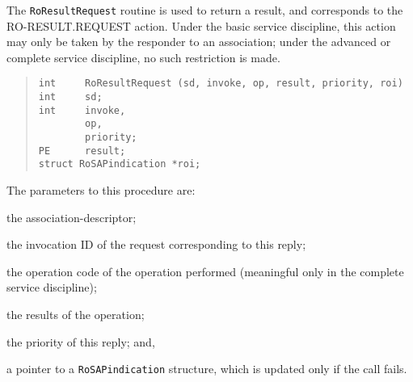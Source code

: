 The \verb"RoResultRequest" routine is used to return a result,
and corresponds to the {\sf RO-RESULT.REQUEST\/} action.
Under the basic service discipline,
this action may only be taken by the responder to an association;
under the advanced or complete service discipline,
no such restriction is made.
\begin{quote}\small\begin{verbatim}
int     RoResultRequest (sd, invoke, op, result, priority, roi)
int     sd;
int     invoke,
        op,
        priority;
PE      result;
struct RoSAPindication *roi;
\end{verbatim}\end{quote}
The parameters to this procedure are:
\begin{describe}
\item[\verb"sd":] the association-descriptor;

\item[\verb"invoke":] the invocation ID of the request corresponding to this
reply;

\item[\verb"op":] the operation code of the operation performed
(meaningful only in the complete service discipline);

\item[\verb"result":] the results of the operation;

\item[\verb"priority":] the priority of this reply;
and,

\item[\verb"roi":] a pointer to a \verb"RoSAPindication" structure, which is
updated only if the call fails.
\end{describe}

